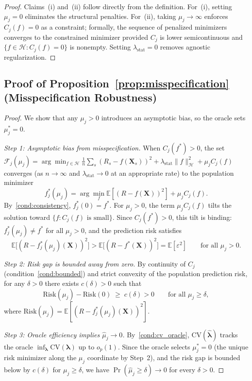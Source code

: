 \begin{proof}
Claims~(i) and~(ii) follow directly from the definition.
For~(i), setting $\mu_j = 0$ eliminates the structural penalties.
For~(ii), taking $\mu_j \to \infty$ enforces $C_j(f) = 0$ as a constraint;
formally, the sequence of penalized minimizers converges to the
constrained minimizer provided $C_j$ is lower semicontinuous and
$\{f \in \mathcal{H} : C_j(f) = 0\}$ is nonempty.
Setting $\lambda_{\mathrm{stat}} = 0$ removes agnostic regularization.
\end{proof}

\subsection{Proof of Proposition~\ref{prop:misspecification} (Misspecification Robustness)}

\begin{proof}
We show that any $\mu_j > 0$ introduces an asymptotic bias, so the
oracle sets $\mu_j^* = 0$.

\emph{Step 1: Asymptotic bias from misspecification.}
When $C_j(f^*) > 0$, the set
$\mathcal{F}_j(\mu_j) = \arg\min_{f \in \mathcal{H}}
\frac{1}{n}\sum_s (R_s - f(\mathbf{X}_s))^2
+ \lambda_{\mathrm{stat}}\|f\|_{\mathcal{H}}^2 + \mu_j C_j(f)$
converges (as $n \to \infty$ and $\lambda_{\mathrm{stat}} \to 0$ at an
appropriate rate) to the population minimizer
\[
f_j^*(\mu_j) = \arg\min_{f} \mathbb{E}[(R - f(\mathbf{X}))^2] + \mu_j C_j(f).
\]
By~\ref{cond:consistency}, $f_j^*(0) = f^*$.
For $\mu_j > 0$, the term $\mu_j C_j(f)$ tilts the solution toward
$\{f : C_j(f) \text{ is small}\}$.
Since $C_j(f^*) > 0$, this tilt is binding: $f_j^*(\mu_j) \neq f^*$
for all $\mu_j > 0$, and the prediction risk satisfies
\[
\mathbb{E}\bigl[(R - f_j^*(\mu_j)(\mathbf{X}))^2\bigr]
> \mathbb{E}\bigl[(R - f^*(\mathbf{X}))^2\bigr]
= \mathbb{E}[\varepsilon^2]
\qquad \text{for all } \mu_j > 0.
\]

\emph{Step 2: Risk gap is bounded away from zero.}
By continuity of $C_j$ (condition~\ref{cond:bounded}) and strict
convexity of the population prediction risk,
for any $\delta > 0$ there exists $c(\delta) > 0$ such that
\[
\mathrm{Risk}(\mu_j) - \mathrm{Risk}(0)
\;\geq\; c(\delta) > 0
\qquad \text{for all } \mu_j \geq \delta,
\]
where $\mathrm{Risk}(\mu_j) = \mathbb{E}[(R - f_j^*(\mu_j)(\mathbf{X}))^2]$.

\emph{Step 3: Oracle efficiency implies $\hat{\mu}_j \to 0$.}
By~\ref{cond:cv_oracle}, $\mathrm{CV}(\hat{\boldsymbol{\lambda}})$
tracks the oracle $\inf_{\boldsymbol{\lambda}} \mathrm{CV}(\boldsymbol{\lambda})$
up to $o_p(1)$.  Since the oracle selects $\mu_j^* = 0$
(the unique risk minimizer along the $\mu_j$ coordinate by Step~2),
and the risk gap is bounded below by $c(\delta)$ for $\mu_j \geq \delta$,
we have $\Pr(\hat{\mu}_j \geq \delta) \to 0$ for every $\delta > 0$.
\end{proof}


